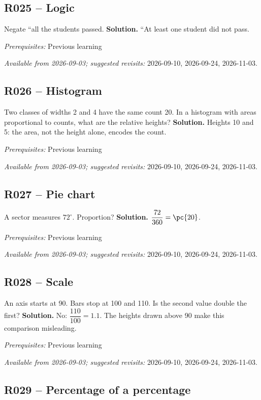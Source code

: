 \subsection*{R025 -- Logic}\label{R025}
Negate ``all the students passed.
\ifmxteacher\textbf{Solution.} ``At least one student did not pass.\par\textit{Prerequisites:} Previous learning\par\textit{Available from 2026-09-03; suggested revisits:} 2026-09-10, 2026-09-24, 2026-11-03.\fi
{}\subsection*{R026 -- Histogram}\label{R026}
Two classes of widths 2 and 4 have the same count 20. In a histogram with areas proportional to counts, what are the relative heights?
\ifmxteacher\textbf{Solution.} Heights 10 and 5: the area, not the height alone, encodes the count.\par\textit{Prerequisites:} Previous learning\par\textit{Available from 2026-09-03; suggested revisits:} 2026-09-10, 2026-09-24, 2026-11-03.\fi
{}\subsection*{R027 -- Pie chart}\label{R027}
A sector measures $72^\circ$. Proportion?
\ifmxteacher\textbf{Solution.} $\dfrac{72}{360}=\pc{20}$.\par\textit{Prerequisites:} Previous learning\par\textit{Available from 2026-09-03; suggested revisits:} 2026-09-10, 2026-09-24, 2026-11-03.\fi
{}\subsection*{R028 -- Scale}\label{R028}
An axis starts at 90. Bars stop at 100 and 110. Is the second value double the first?
\ifmxteacher\textbf{Solution.} No: $\dfrac{110}{100}=\num{1,1}$. The heights drawn above 90 make this comparison misleading.\par\textit{Prerequisites:} Previous learning\par\textit{Available from 2026-09-03; suggested revisits:} 2026-09-10, 2026-09-24, 2026-11-03.\fi
{}\subsection*{R029 -- Percentage of a percentage}\label{R029}
